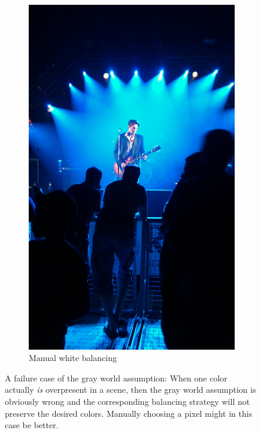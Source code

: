 \documentclass[a4paper]{article}
\begin{document}
\begin{figure}[H]
\begin{subfigure}[h]{0.48\textwidth}
		\includegraphics[width=\textwidth]{concert_manual}
		\caption*{Manual white balancing}
	\end{subfigure}	
\caption{A failure case of the gray world assumption: When one color actually \textit{is} overpresent in a scene, then the gray world assumption is obviously wrong and the corresponding balancing strategy will not preserve the desired colors. Manually choosing a pixel might in this case be better.}
\label{fig:concert-balance}
\end{figure}
\end{document}
